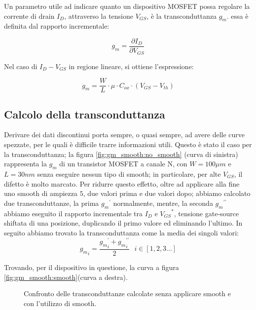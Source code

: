 Un parametro utile ad indicare quanto un dispositivo MOSFET possa regolare la corrente di drain $I_D$, attraverso la tensione $V_{GS}$, è la transconduttanza $g_m$. essa è definita dal rapporto incrementale:

$$g_m = \frac{\partial I_D}{\partial V_{GS}}$$

Nel caso di $I_D-V_{GS}$ in regione lineare, si ottiene l'espressione:

$$g_m = \frac{W}{L} \cdot \mu \cdot C_{ox} \cdot (V_{GS} - V_{th})$$


\subsection{Calcolo della transconduttanza}
Derivare dei dati discontinui porta sempre, o quasi sempre, ad avere delle curve spezzate, per le quali è difficile trarre informazioni utili.
Questo è stato il caso per la transconduttanza; la figura \ref{fig:gm_smooth:no_smooth} (curva di sinistra) rappresenta la $g_m$ di un transistor  MOSFET a canale N, con $ W = 100\mu m$ e $L = 30 nm$ senza eseguire nessun tipo di smooth; in particolare, per alte $V_{GS}$, il difetto è molto marcato. Per ridurre questo effetto, oltre ad applicare alla fine uno smooth di ampiezza $5$, due valori prima e due valori dopo; abbiamo calcolato due transconduttanze, la prima ${g_m}^{\prime}$ normalmente, mentre, la seconda ${g_m}^{\prime \prime}$ abbiamo eseguito il rapporto incrementale tra $I_D$ e ${V_{GS}}^*$, tensione gate-source shiftata di una posizione, duplicando il primo valore ed eliminando l'ultimo. In seguito abbiamo trovato la transconduttanza come la media dei singoli valori: 
$${g_m}_i = \frac{{g_m}_i^{\prime} + {g_m}_i^{\prime \prime}}{2} \text{ } i \in [1 , 2 , 3 . . .]$$

Trovando, per il dispositivo in questione, la curva a figura \ref{fig:gm_smooth:smooth}(curva a destra).

\begin{figure}[t]
    \centering

    \caption[Confronto $g_m$ senza utilizzo di smooth e con utilizzo di smooth]{Confronto delle transconduttanze calcolate senza applicare smooth e con l'utilizzo di smooth.}
    \label{fig:gm_smooth}
\end{figure}


